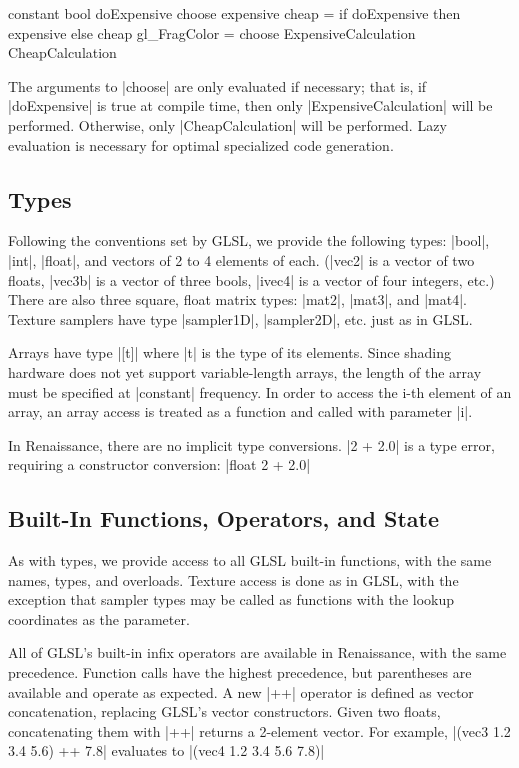 \documentclass{acmsiggraph}               %
\begin{document}
\begin{MyVerb}
constant bool doExpensive
choose expensive cheap = 
        if doExpensive then expensive else cheap
gl_FragColor = choose ExpensiveCalculation
                      CheapCalculation
\end{MyVerb}

The arguments to |choose| are only evaluated if necessary; that is, if
|doExpensive| is true at compile time, then only
|ExpensiveCalculation| will be performed.  Otherwise, only
|CheapCalculation| will be performed.  Lazy evaluation is necessary
for optimal specialized code generation.

\subsection{Types}

Following the conventions set by GLSL, we provide the following types:
|bool|, |int|, |float|, and vectors of 2 to 4 elements of each.
(|vec2| is a vector of two floats, |vec3b| is a vector of three bools,
|ivec4| is a vector of four integers, etc.)  There are also three
square, float matrix types: |mat2|, |mat3|, and |mat4|.  Texture
samplers have type |sampler1D|, |sampler2D|, etc. just as in GLSL.

Arrays have type |[t]| where |t| is the type of its elements.  Since
shading hardware does not yet support variable-length arrays, the
length of the array must be specified at |constant| frequency.  In
order to access the i-th element of an array, an array access is
treated as a function and called with parameter |i|.

In Renaissance, there are no implicit type conversions.  |2 + 2.0| is
a type error, requiring a constructor conversion: |float 2 + 2.0|


\subsection{Built-In Functions, Operators, and State}

As with types, we provide access to all GLSL built-in functions, with
the same names, types, and overloads.  Texture access is done as in
GLSL, with the exception that sampler types may be called as functions
with the lookup coordinates as the parameter.

All of GLSL's built-in infix operators are available in Renaissance,
with the same precedence.  Function calls have the highest precedence,
but parentheses are available and operate as expected.  A new |++|
operator is defined as vector concatenation, replacing GLSL's vector
constructors.  Given two floats, concatenating them with |++| returns
a 2-element vector.  For example, |(vec3 1.2 3.4 5.6) ++ 7.8|
evaluates to |(vec4 1.2 3.4 5.6 7.8)|
\end{document}
